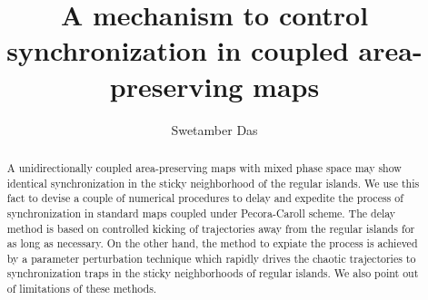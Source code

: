 \documentclass[preprint,showpacs,preprintnumbers,amsmath,amssymb]{revtex4-1}
\begin{document}
\title{A mechanism to control synchronization in coupled area-preserving maps}
\author{Swetamber Das}

\begin{abstract}
    A unidirectionally coupled area-preserving maps with mixed phase space may 
    show identical synchronization in the sticky neighborhood of the regular 
    islands. We use this fact to devise a couple of numerical procedures to 
    delay and expedite the process of synchronization in standard maps coupled 
    under  Pecora-Caroll scheme. The delay method is based on controlled 
    kicking of trajectories away from the regular islands for as long as 
    necessary. On the other hand, the method to expiate the process is
    achieved by a parameter perturbation technique which rapidly drives the 
    chaotic trajectories to synchronization traps in the sticky neighborhoods 
    of regular islands. We also point out of limitations of these methods. 
\end{abstract}
\maketitle
\end{document}
